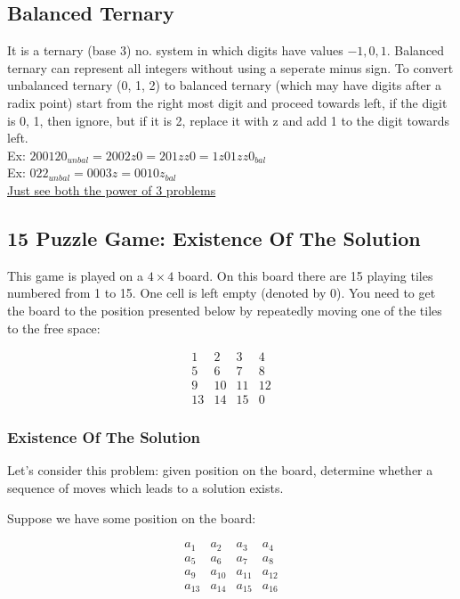 \documentclass[8pt, a4paper, oneside, twocolumn]{extarticle}
\begin{document}
\subsection{Balanced Ternary}
It is a ternary (base 3) no. system in which digits have values $-1, 0, 1$. Balanced ternary can represent all integers without using a seperate minus sign. To convert unbalanced ternary (0, 1, 2) to balanced ternary (which may have digits after a radix point) start from the right most digit and proceed towards left, if the digit is 0, 1, then ignore, but if it is 2, replace it with z and add 1 to the digit towards left.
\\Ex: $200120_{unbal} = 2002z0 = 201zz0 = 1z01zz0_{bal}$
\\Ex: $022_{unbal} = 0003z = 0010z_{bal}$
\\\href{https://apps.topcoder.com/wiki/display/tc/SRM+604}{Just see both the power of 3 problems}
\subsection{15 Puzzle Game: Existence Of The Solution}

This game is played on a $4 \times 4$ board. On this board there are 15 playing tiles numbered from 1 to 15. One cell is left empty (denoted by 0). You need to get the board to the position presented below by repeatedly moving one of the tiles to the free space:

$$\begin{matrix} 1 & 2 & 3 & 4 \\ 5 & 6 & 7 & 8 \\ 9 & 10 & 11 & 12 \\ 13 & 14 & 15 & 0 \end{matrix}$$

\subsubsection{Existence Of The Solution}

Let's consider this problem: given position on the board, determine whether a sequence of moves which leads to a solution exists.

Suppose we have some position on the board:

$$\begin{matrix} a_1 & a_2 & a_3 & a_4 \\ a_5 & a_6 & a_7 & a_8 \\ a_9 & a_{10} & a_{11} & a_{12} \\ a_{13} & a_{14} & a_{15} & a_{16} \end{matrix}$$
\end{document}
